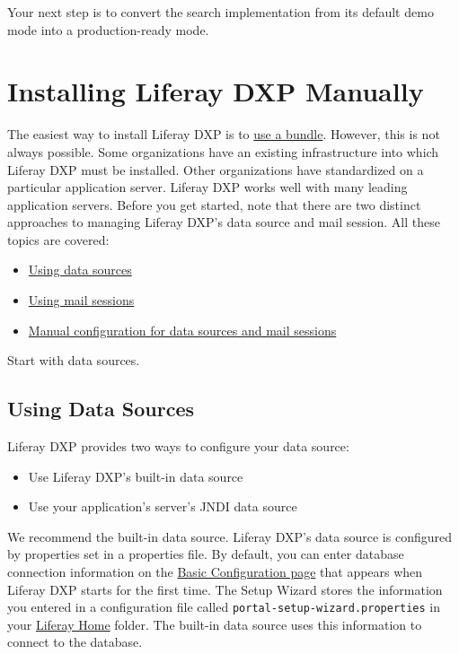 Your next step is to convert the search implementation from its default
demo mode into a production-ready mode.

\section{Installing Liferay DXP
Manually}\label{installing-liferay-dxp-manually}

The easiest way to install Liferay DXP is to
\href{/docs/7-1/deploy/-/knowledge_base/d/installing-liferay}{use a
bundle}. However, this is not always possible. Some organizations have
an existing infrastructure into which Liferay DXP must be installed.
Other organizations have standardized on a particular application
server. Liferay DXP works well with many leading application servers.
Before you get started, note that there are two distinct approaches to
managing Liferay DXP's data source and mail session. All these topics
are covered:

\begin{itemize}
\tightlist
\item
  \hyperref[using-data-sources]{Using data sources}
\item
  \hyperref[using-mail-sessions]{Using mail sessions}
\item
  \hyperref[manual-configuration]{Manual configuration for data sources
  and mail sessions}
\end{itemize}

Start with data sources.

\subsection{Using Data Sources}\label{using-data-sources}

Liferay DXP provides two ways to configure your data source:

\begin{itemize}
\tightlist
\item
  Use Liferay DXP's built-in data source
\item
  Use your application's server's JNDI data source
\end{itemize}

We recommend the built-in data source. Liferay DXP's data source is
configured by properties set in a properties file. By default, you can
enter database connection information on the
\href{/docs/7-1/deploy/-/knowledge_base/d/installing-liferay\#using-the-setup-wizard}{Basic
Configuration page} that appears when Liferay DXP starts for the first
time. The Setup Wizard stores the information you entered in a
configuration file called \texttt{portal-setup-wizard.properties} in
your
\href{/docs/7-1/deploy/-/knowledge_base/d/installing-liferay\#liferay-home}{Liferay
Home} folder. The built-in data source uses this information to connect
to the database.

